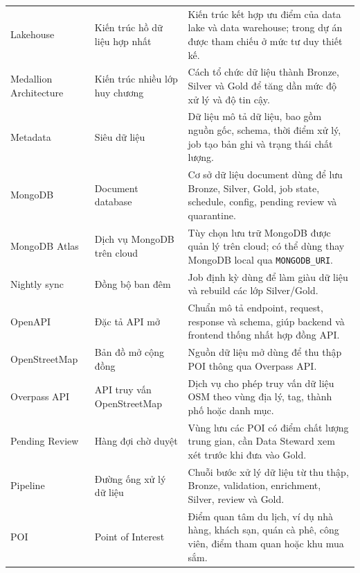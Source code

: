 \documentclass[12pt,a4paper]{article}
\begin{document}
\begin{longtable}{@{}p{}p{}p{}@{}}
Lakehouse & Kiến trúc hồ dữ liệu hợp nhất & Kiến trúc kết hợp ưu điểm của data lake và data warehouse; trong dự án được tham chiếu ở mức tư duy thiết kế. \\

Medallion Architecture & Kiến trúc nhiều lớp huy chương & Cách tổ chức dữ liệu thành Bronze, Silver và Gold để tăng dần mức độ xử lý và độ tin cậy. \\

Metadata & Siêu dữ liệu & Dữ liệu mô tả dữ liệu, bao gồm nguồn gốc, schema, thời điểm xử lý, job tạo bản ghi và trạng thái chất lượng. \\

MongoDB & Document database & Cơ sở dữ liệu document dùng để lưu Bronze, Silver, Gold, job state, schedule, config, pending review và quarantine. \\

MongoDB Atlas & Dịch vụ MongoDB trên cloud & Tùy chọn lưu trữ MongoDB được quản lý trên cloud; có thể dùng thay MongoDB local qua \texttt{MONGODB\_URI}. \\

Nightly sync & Đồng bộ ban đêm & Job định kỳ dùng để làm giàu dữ liệu và rebuild các lớp Silver/Gold. \\

OpenAPI & Đặc tả API mở & Chuẩn mô tả endpoint, request, response và schema, giúp backend và frontend thống nhất hợp đồng API. \\

OpenStreetMap & Bản đồ mở cộng đồng & Nguồn dữ liệu mở dùng để thu thập POI thông qua Overpass API. \\

Overpass API & API truy vấn OpenStreetMap & Dịch vụ cho phép truy vấn dữ liệu OSM theo vùng địa lý, tag, thành phố hoặc danh mục. \\

Pending Review & Hàng đợi chờ duyệt & Vùng lưu các POI có điểm chất lượng trung gian, cần Data Steward xem xét trước khi đưa vào Gold. \\

Pipeline & Đường ống xử lý dữ liệu & Chuỗi bước xử lý dữ liệu từ thu thập, Bronze, validation, enrichment, Silver, review và Gold. \\

POI & Point of Interest & Điểm quan tâm du lịch, ví dụ nhà hàng, khách sạn, quán cà phê, công viên, điểm tham quan hoặc khu mua sắm. \\


\end{longtable}
\end{document}
